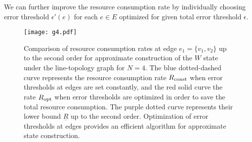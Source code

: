 \documentclass[preprintnumbers,aps,amsmath,amssymb,pra,twocolumn,showpacs,superscriptaddress,floatfix]{revtex4-1}
\theoremstyle{plain}
\theoremstyle{definition}
\theoremstyle{remark}
\begin{document}
We can further improve the resource consumption rate by individually choosing error threshold $\epsilon'(e)$ for each $e\in E$ optimized for given total error threshold $\epsilon$.

\begin{figure}
\centering
\texttt{[image: g4.pdf]}
\caption{Comparison of resource consumption rates at edge $e_1=\{v_1,v_2\}$ up to the second order for approximate construction of the $W$ state under the line-topology graph for $N=4$.
        The blue dotted-dashed curve represents the resource consumption rate $R_{\textup{const}}$ when error thresholds at edges are set constantly, and the red solid curve the rate $R_{\textup{opt}}$ when error thresholds are optimized in order to save the total resource consumption.
        The purple dotted curve represents their lower bound $\underline{R}$ up to the second order.
        Optimization of error thresholds at edges provides an efficient algorithm for approximate state construction.
}
\label{fig:graph4}
\end{figure}
\end{document}
